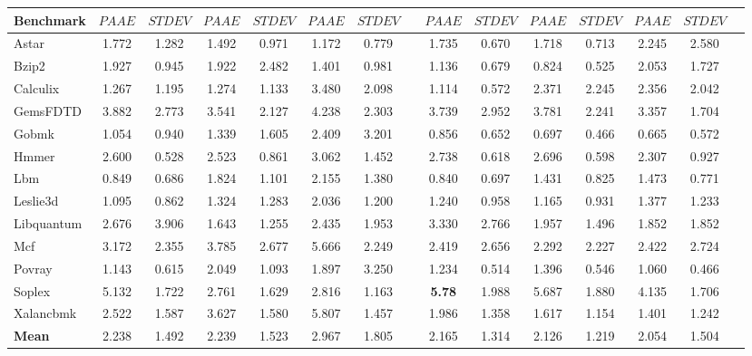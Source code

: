 \begin{table}
{\begin{tabular}{@{}l SSSSSS c@{\hspace{-1em}}  SSSSSS c   @{}}
    \cmidrule(r){2-3} \cmidrule(r){4-5} \cmidrule(r){6-7} 
    \cmidrule(r){9-10} \cmidrule(r){11-12} \cmidrule(r){13-14}
    Benchmark &  &  &  &  &  & 
    &&  &  &  &  &  &  \\
    \midrule
    Astar           &1.772&1.282&1.492&0.971&1.172&0.779 &&1.735&0.670&1.718&0.713&2.245&2.580\\ %
    Bzip2           &1.927&0.945&1.922&2.482&1.401&0.981 &&1.136&0.679&0.824&0.525&2.053&1.727\\ %
    Calculix        &1.267&1.195&1.274&1.133&3.480&2.098 &&1.114&0.572&2.371&2.245&2.356&2.042\\ %
    GemsFDTD        &3.882&2.773&3.541&2.127&4.238&2.303 &&3.739&2.952&3.781&2.241&3.357&1.704\\ %
    Gobmk           &1.054&0.940&1.339&1.605&2.409&3.201 &&0.856&0.652&0.697&0.466&0.665&0.572\\ %
    Hmmer           &2.600&0.528&2.523&0.861&3.062&1.452 &&2.738&0.618&2.696&0.598&2.307&0.927\\ %
    Lbm             &0.849&0.686&1.824&1.101&2.155&1.380 &&0.840&0.697&1.431&0.825&1.473&0.771\\ %
    Leslie3d        &1.095&0.862&1.324&1.283&2.036&1.200 &&1.240&0.958&1.165&0.931&1.377&1.233\\ %
    Libquantum      &2.676&3.906&1.643&1.255&2.435&1.953 &&3.330&2.766&1.957&1.496&1.852&1.852\\ %
    Mcf             &3.172&2.355&3.785&2.677&5.666&2.249 &&2.419&2.656&2.292&2.227&2.422&2.724\\ %
    Povray          &1.143&0.615&2.049&1.093&1.897&3.250 &&1.234&0.514&1.396&0.546&1.060&0.466\\ %
    Soplex          &5.132&1.722&2.761&1.629&2.816&1.163 &&  \textbf{5.78}  &1.988&5.687&1.880&4.135&1.706\\ %
    Xalancbmk       &2.522&1.587&3.627&1.580&5.807&1.457 &&1.986&1.358&1.617&1.154&1.401&1.242\\ %
    {\bf Mean}      &2.238&1.492&2.239&1.523&2.967&1.805 &&2.165&1.314&2.126&1.219&2.054&1.504\\ 
\bottomrule
\end{tabular}
}
\label{tab: P--States: PAAE, Standard deviation and Confidence for SPECcpu2006 benchmarks -- POWER.}
\end{table}


